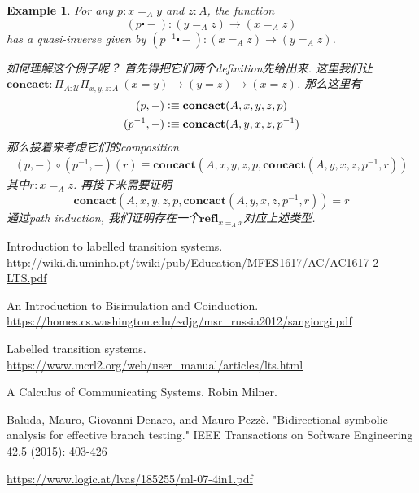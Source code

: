 \documentclass{article}
\newtheorem{example}[theorem]{Example}
\newcommand{\defeqv}{\vcentcolon\equiv}
\newcommand{\refl}{\textbf{refl}}
\begin{document}
\begin{example}
\rm For any $p :  x=_A y $ and $z : A$, the function
\[
    (p \centerdot -) : (y =_A z) \to (x =_A z)
\]
has a quasi-inverse given by $(p^{-1} \centerdot -) : (x =_A z) \to (y =_A z)$. 

如何理解这个例子呢？ 首先得把它们两个definition先给出来. 这里我们让$\textbf{concact} : \Pi_{A : \mathcal{U}}\Pi_{x,y,z : A} ~ (x = y) \to (y=z) \to (x=z)$. 那么这里有
\[
    \begin{aligned}
        (p , - ) &\defeqv \textbf{concact}(A,x,y,z,p) \\
        (p^{-1}, -) &\defeqv \textbf{concact}(A,y,x,z,p^{-1})
    \end{aligned}
\]
那么接着来考虑它们的composition
\[
    \begin{aligned}
        (p , - ) \circ (p^{-1} , -) (r) \equiv \textbf{concact}(A,x,y,z,p, \textbf{concact}(A,y,x,z,p^{-1},r))
    \end{aligned}
\]
其中$r : x =_A z$. 再接下来需要证明
\[
    \textbf{concact}(A,x,y,z,p, \textbf{concact}(A,y,x,z,p^{-1},r)) = r
\]
通过path induction, 我们证明存在一个$\refl_{x=_A x}$对应上述类型.
\end{example}


\newpage
\begin{thebibliography}{9}
Introduction to labelled transition systems. \newline\url{http://wiki.di.uminho.pt/twiki/pub/Education/MFES1617/AC/AC1617-2-LTS.pdf}

An Introduction to Bisimulation and Coinduction. \newline\url{https://homes.cs.washington.edu/~djg/msr_russia2012/sangiorgi.pdf}

Labelled transition systems. \newline\url{https://www.mcrl2.org/web/user_manual/articles/lts.html}


A Calculus of Communicating Systems. Robin Milner. 

Baluda, Mauro, Giovanni Denaro, and Mauro Pezzè. "Bidirectional symbolic analysis for effective branch testing." IEEE Transactions on Software Engineering 42.5 (2015): 403-426

\url{https://www.logic.at/lvas/185255/ml-07-4in1.pdf}
\end{thebibliography}
\end{document}
